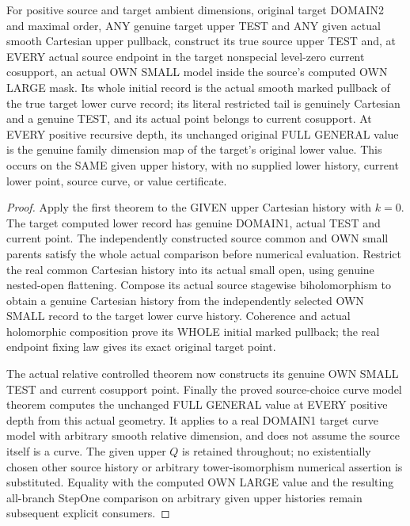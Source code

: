 \begin{theorem}
\label{hir:original-given-upper-cartesian-own-small-curve-values}
\leanok
For positive source and target ambient dimensions, original target DOMAIN2
and maximal order, ANY genuine target upper TEST and ANY given actual
smooth Cartesian upper pullback, construct its true source upper TEST and,
at EVERY actual source endpoint in the target nonspecial level-zero current
cosupport, an actual OWN SMALL model inside the source's computed OWN LARGE
mask. Its whole initial record is the actual smooth marked pullback of the
true target lower curve record; its literal restricted tail is genuinely
Cartesian and a genuine TEST, and its actual point belongs to current
cosupport. At EVERY positive recursive depth, its unchanged original FULL
GENERAL value is the genuine family dimension map of the target's original
lower value. This occurs on the SAME given upper history, with no supplied
lower history, current lower point, source curve, or value certificate.
\end{theorem}
\begin{proof}
Apply the first theorem to the GIVEN upper Cartesian history with $k=0$.
The target computed lower record has genuine DOMAIN1, actual TEST and
current point. The independently constructed source common and OWN small
parents satisfy the whole actual comparison before numerical evaluation.
Restrict the real common Cartesian history into its actual small open,
using genuine nested-open flattening. Compose its actual source stagewise
biholomorphism to obtain a genuine Cartesian history from the independently
selected OWN SMALL record to the target lower curve history. Coherence and
actual holomorphic composition prove its WHOLE initial marked pullback;
the real endpoint fixing law gives its exact original target point.

The actual relative controlled theorem now constructs its genuine OWN SMALL
TEST and current cosupport point. Finally the proved source-choice curve
model theorem computes the unchanged FULL GENERAL value at EVERY positive
depth from this actual geometry. It applies to a real DOMAIN1 target curve
model with arbitrary smooth relative dimension, and does not assume the
source itself is a curve. The given upper $Q$ is retained throughout; no
existentially chosen other source history or arbitrary tower-isomorphism
numerical assertion is substituted. Equality with the computed OWN LARGE
value and the resulting all-branch StepOne comparison on arbitrary given
upper histories remain subsequent explicit consumers.
\end{proof}

